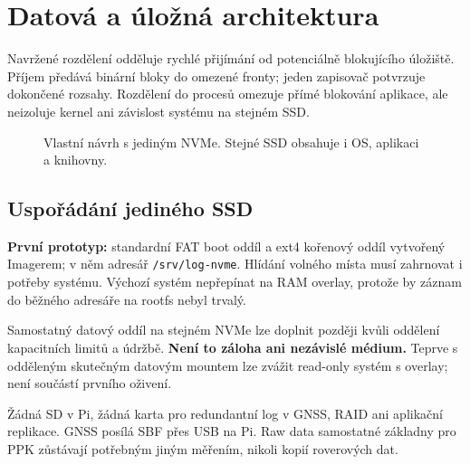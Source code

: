 \documentclass[11pt,a4paper]{article}
\newcommand{\novastrana}{\clearpage}
\begin{document}
\novastrana
\section{Datová a úložná architektura}
Navržené rozdělení odděluje rychlé přijímání od potenciálně blokujícího úložiště. Příjem předává binární bloky do omezené fronty; jeden zapisovač potvrzuje dokončené rozsahy. Rozdělení do procesů omezuje přímé blokování aplikace, ale neizoluje kernel ani závislost systému na stejném SSD.

\begin{figure}[htbp]\centering
{}
\caption{Vlastní návrh s jediným NVMe. Stejné SSD obsahuje i OS, aplikaci a knihovny.}
\end{figure}

\subsection{Uspořádání jediného SSD}
\textbf{První prototyp:} standardní FAT boot oddíl a ext4 kořenový oddíl vytvořený Imagerem; v něm adresář \texttt{/srv/log-nvme}. Hlídání volného místa musí zahrnovat i potřeby systému. Výchozí systém nepřepínat na RAM overlay, protože by záznam do běžného adresáře na rootfs nebyl trvalý.

Samostatný datový oddíl na stejném NVMe lze doplnit později kvůli oddělení kapacitních limitů a údržbě. \textbf{Není to záloha ani nezávislé médium.} Teprve s odděleným skutečným datovým mountem lze zvážit read-only systém s overlay; není součástí prvního oživení.\cite{rpconfig}

Žádná SD v Pi, žádná karta pro redundantní log v GNSS, RAID ani aplikační replikace. GNSS posílá SBF přes USB na Pi. Raw data samostatné základny pro PPK zůstávají potřebným jiným měřením, nikoli kopií roverových dat.
\end{document}
